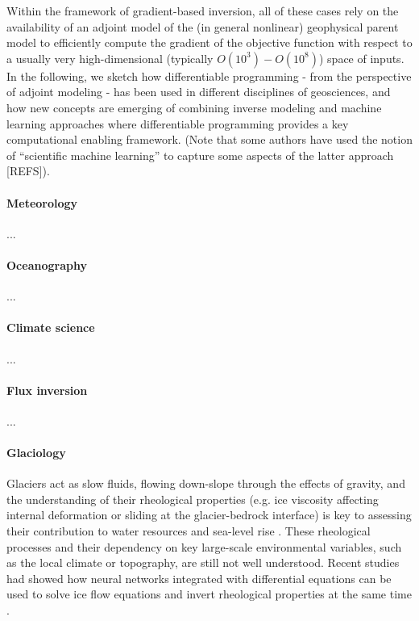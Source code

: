 %
Within the framework of gradient-based inversion, all of these cases rely on the availability of an adjoint model of the (in general nonlinear) geophysical parent model to efficiently compute the gradient of the objective function with respect to a usually very high-dimensional (typically $O(10^3) - O(10^8)$) space of inputs.
In the following, we sketch how differentiable programming - from the perspective of adjoint modeling - has been used in different disciplines of geosciences, and how new concepts are emerging of combining inverse modeling and machine learning approaches where differentiable programming provides a key computational enabling framework. (Note that some authors have used the notion of ``scientific machine learning'' to capture some aspects of the latter approach [REFS]).


\paragraph{Meteorology}
...

\paragraph{Oceanography}
...

\paragraph{Climate science}
...

\paragraph{Flux inversion}
...

\paragraph{Glaciology}

Glaciers act as slow fluids, flowing down-slope through the effects of gravity, and the understanding of their rheological properties (e.g. ice viscosity affecting internal deformation or sliding at the glacier-bedrock interface) is key to assessing their contribution to water resources and sea-level rise \cite{cuffey_physics_2010}. 
These rheological processes and their dependency on key large-scale environmental variables, such as the local climate or topography, are still not well understood.
Recent studies had showed how neural networks integrated with differential equations can be used to solve ice flow equations\cite{Jouvet_Cordonnier_Kim_Lüthi_Vieli_Aschwanden_2021, Jouvet_2022} and invert rheological properties at the same time \cite{bolibar_universal_2023, wang2022discovering}.  

